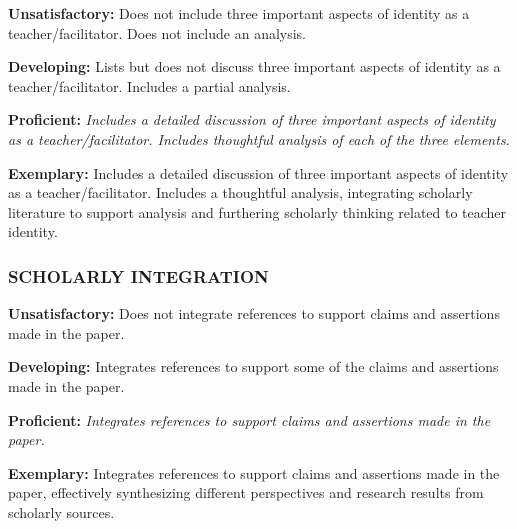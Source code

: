\documentclass[
]{book}
\begin{document}
\textbf{Unsatisfactory:} Does not include three important aspects of identity as a teacher/facilitator. Does not include an analysis.

\textbf{Developing:} Lists but does not discuss three important aspects of identity as a teacher/facilitator. Includes a partial analysis.

\textbf{Proficient:} \emph{Includes a detailed discussion of three important aspects of identity as a teacher/facilitator. Includes thoughtful analysis of each of the three elements.}

\textbf{Exemplary:} Includes a detailed discussion of three important aspects of identity as a teacher/facilitator. Includes a thoughtful analysis, integrating scholarly literature to support analysis and furthering scholarly thinking related to teacher identity.

\hypertarget{scholarly-integration}{%
\subsubsection*{SCHOLARLY INTEGRATION}\label{scholarly-integration}}

\textbf{Unsatisfactory:} Does not integrate references to support claims and assertions made in the paper.

\textbf{Developing:} Integrates references to support some of the claims and assertions made in the paper.

\textbf{Proficient:} \emph{Integrates references to support claims and assertions made in the paper.}

\textbf{Exemplary:} Integrates references to support claims and assertions made in the paper, effectively synthesizing different perspectives and research results from scholarly sources.
\end{document}
